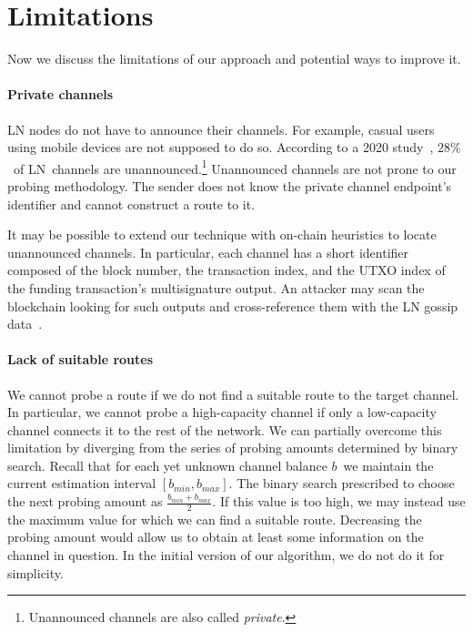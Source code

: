 \pagebreak

\section{Limitations}

Now we discuss the limitations of our approach and potential ways to improve it.

\paragraph{Private channels}

LN nodes do not have to announce their channels.
For example, casual users using mobile devices are not supposed to do so.
According to a 2020 study~\cite{BitMEXPrivateChannels}, $28\%$~of LN~channels are unannounced.\footnote{Unannounced channels are also called \textit{private}.}
Unannounced channels are not prone to our probing methodology.
The sender does not know the private channel endpoint's identifier and cannot construct a route to it.

It may be possible to extend our technique with on-chain heuristics to locate unannounced channels.
In particular, each channel has a short identifier composed of the block number, the transaction index, and the UTXO index of the funding transaction's multisignature output.
An attacker may scan the blockchain looking for such outputs and cross-reference them with the LN gossip data~\cite{Pickhardt2020}.

\paragraph{Lack of suitable routes}

We cannot probe a route if we do not find a suitable route to the target channel.
In particular, we cannot probe a high-capacity channel if only a low-capacity channel connects it to the rest of the network.
We can partially overcome this limitation by diverging from the series of probing amounts determined by binary search.
Recall that for each yet unknown channel balance $b$~we maintain the current estimation interval $[b_{min}, b_{max}]$.
The binary search prescribed to choose the next probing amount as $\frac{b_{min} + b_{max}}{2}$.
If this value is too high, we may instead use the maximum value for which we can find a suitable route.
Decreasing the probing amount would allow us to obtain at least some information on the channel in question.
In the initial version of our algorithm, we do not do it for simplicity.


